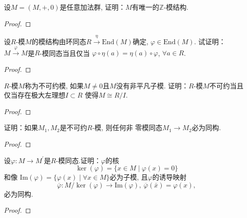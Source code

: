 \begin{problem}
    设$M = (M, +, 0)$是任意加法群, 证明：$M$有唯一的$\mathbb{Z}$-模结构.
\end{problem}

\begin{proof}
    
\end{proof}

\begin{problem}
    设$R$-模$M$的模结构由环同态$R \xrightarrow{\eta} \mathrm{End}(M)$确定, 
$\varphi \in \mathrm{End}(M)$. 试证明：
$M \xrightarrow{\varphi} M$是$R$-模同态当且仅当
$\varphi \circ \eta (a) = \eta (a) \circ \varphi$, $\forall a \in R$.
\end{problem}

\begin{proof}
    
\end{proof}

\begin{problem}
    $R$-模$M$称为不可约模, 如果$M \neq 0$且$M$没有非平凡子模.
证明：$R$-模$M$不可约当且仅当存在极大左理想$I \subset R$
使得$M \cong R/I$.
\end{problem}

\begin{proof}
    
\end{proof}

\begin{problem}[舒尔(Schur)引理]
    证明：如果$M_1, M_2$是不可约$R$-模, 则任何非
零模同态$M_1 \to M_2$必为同构.
\end{problem}

\begin{proof}
    
\end{proof}

\begin{problem}[同态基本定理]
    设$\varphi:M\to M^{\prime}$是$R$-模同态.证明：$\varphi$的核
\[
    \ker(\varphi) = \{x \in M \mid \varphi(x) = 0\}
\]
和像 $\mathrm{Im}(\varphi) = \{\varphi(x) \mid \forall x \in M\}$必为子模, 
且$\varphi$的诱导映射
\[
    \overline{\varphi}:M/\ker(\varphi) \to \mathrm{Im}(\varphi),\: \overline{\varphi}(\bar{x}) = \varphi(x),
\]
必为同构.
\end{problem}

\begin{proof}
    
\end{proof}